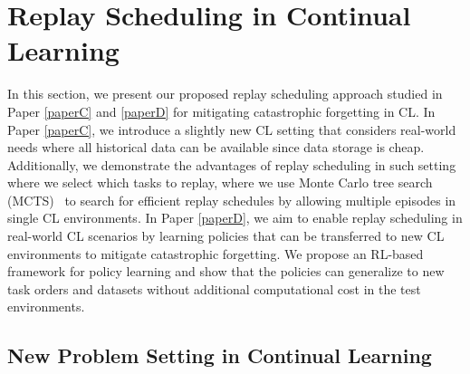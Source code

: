 \section{Replay Scheduling in Continual Learning}\label{chap4:sec:replay_scheduling_in_cl}

In this section, we present our proposed replay scheduling approach studied in Paper \ref{paperC} and \ref{paperD} for mitigating catastrophic forgetting in CL. In Paper  \ref{paperC}, we introduce a slightly new CL setting that considers real-world needs where all historical data can be available since data storage is cheap. Additionally, we demonstrate the advantages of replay scheduling in such setting where we select which tasks to replay, where we use Monte Carlo tree search (MCTS)~\cite{coulom2006efficient} to search for efficient replay schedules by allowing multiple episodes in single CL environments. In Paper \ref{paperD}, we aim to enable replay scheduling in real-world CL scenarios by learning policies that can be transferred to new CL environments to mitigate catastrophic forgetting. We propose an RL-based framework for policy learning and show that the policies can generalize to new task orders and datasets without additional computational cost in the test environments. 




\subsection{New Problem Setting in Continual Learning}

